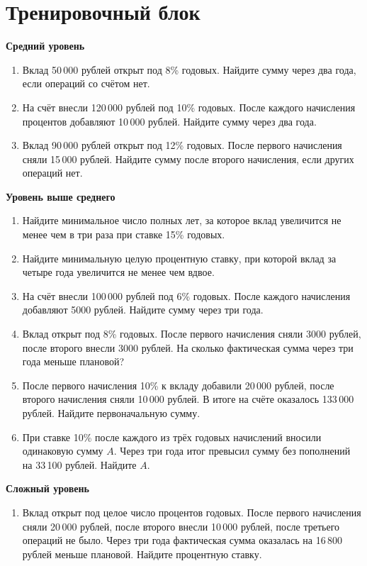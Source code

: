 \documentclass[a4paper,12pt]{article}
\begin{document}
\section{Тренировочный блок}
\begin{sloppypar}

\textbf{Средний уровень}

\begin{enumerate}
  \item Вклад 50\,000 рублей открыт под 8\% годовых. Найдите сумму через два года, если операций со счётом нет.
  \item На счёт внесли 120\,000 рублей под 10\% годовых. После каждого начисления процентов добавляют 10\,000 рублей. Найдите сумму через два года.
  \item Вклад 90\,000 рублей открыт под 12\% годовых. После первого начисления сняли 15\,000 рублей. Найдите сумму после второго начисления, если других операций нет.
\end{enumerate}

\textbf{Уровень выше среднего}

\begin{enumerate}[resume]
  \item Найдите минимальное число полных лет, за которое вклад увеличится не менее чем в три раза при ставке 15\% годовых.
  \item Найдите минимальную целую процентную ставку, при которой вклад за четыре года увеличится не менее чем вдвое.
  \item На счёт внесли 100\,000 рублей под 6\% годовых. После каждого начисления добавляют 5000 рублей. Найдите сумму через три года.
  \item Вклад открыт под 8\% годовых. После первого начисления сняли 3000 рублей, после второго внесли 3000 рублей. На сколько фактическая сумма через три года меньше плановой?
  \item После первого начисления 10\% к вкладу добавили 20\,000 рублей, после второго начисления сняли 10\,000 рублей. В итоге на счёте оказалось 133\,000 рублей. Найдите первоначальную сумму.
  \item При ставке 10\% после каждого из трёх годовых начислений вносили одинаковую сумму $A$. Через три года итог превысил сумму без пополнений на 33\,100 рублей. Найдите $A$.
\end{enumerate}

\textbf{Сложный уровень}

\begin{enumerate}[resume]
  \item Вклад открыт под целое число процентов годовых. После первого начисления сняли 20\,000 рублей, после второго внесли 10\,000 рублей, после третьего операций не было. Через три года фактическая сумма оказалась на 16\,800 рублей меньше плановой. Найдите процентную ставку.
\end{enumerate}
\end{sloppypar}
\end{document}
